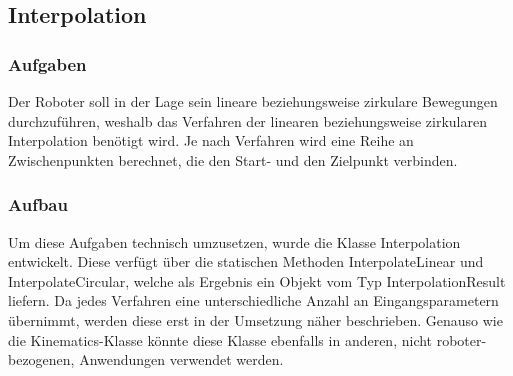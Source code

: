 
\subsection{Interpolation}

\subsubsection{Aufgaben}
Der Roboter soll in der Lage sein lineare beziehungsweise zirkulare Bewegungen durchzuführen, weshalb das Verfahren der linearen beziehungsweise zirkularen Interpolation benötigt wird. Je nach Verfahren wird eine Reihe an Zwischenpunkten berechnet, die den Start- und den Zielpunkt verbinden.

\subsubsection{Aufbau}
Um diese Aufgaben technisch umzusetzen, wurde die Klasse Interpolation entwickelt. Diese verfügt über die statischen Methoden InterpolateLinear und InterpolateCircular, welche als Ergebnis ein Objekt vom Typ InterpolationResult liefern. Da jedes Verfahren eine unterschiedliche Anzahl an Eingangsparametern übernimmt, werden diese erst in der Umsetzung näher beschrieben. Genauso wie die Kinematics-Klasse könnte diese Klasse ebenfalls in anderen, nicht roboter-bezogenen, Anwendungen verwendet werden.

